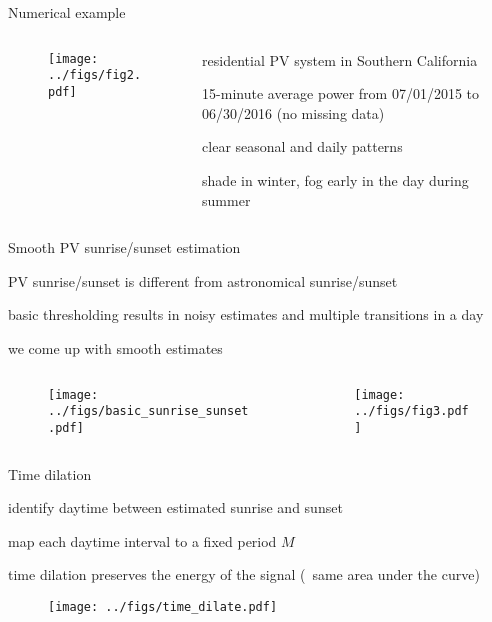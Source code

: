 \documentclass[aspectratio=169,11pt]{beamer}
\begin{document}
\begin{frame}{Numerical example}
\begin{columns}
	\begin{column}{0.5\textwidth}
		\begin{figure}
			\centering
			\texttt{[image: ../figs/fig2.pdf]}
		\end{figure}
	\end{column}
	\begin{column}{0.5\textwidth}
		\BIT
		\item residential PV system in Southern California
		\item 15-minute average power from 07/01/2015 to 06/30/2016
		(no missing data)
		\item clear seasonal and
		daily patterns
		\item shade in winter, fog early in the day during summer
		\EIT
	\end{column}
\end{columns}
\end{frame}

\begin{frame}{Smooth PV sunrise/sunset estimation}
\BIT
\item PV sunrise/sunset is different from astronomical sunrise/sunset
\item basic thresholding results in noisy estimates and multiple transitions in a day
\item we come up with smooth estimates
\EIT
	\begin{columns}
		\begin{column}{0.5\textwidth}
			\begin{figure}
				\centering
				\texttt{[image: ../figs/basic\_sunrise\_sunset.pdf]}
			\end{figure}
		\end{column}
		\begin{column}{0.5\textwidth}
			\begin{figure}
				\centering
				\texttt{[image: ../figs/fig3.pdf]}
			\end{figure}
		\end{column}
	\end{columns}

\end{frame}

\begin{frame}{Time dilation}
\BIT
\item identify daytime between estimated sunrise and sunset
\item map each daytime interval to a fixed period $M$
\item time dilation preserves the energy of the signal (\ie \ same area under the curve)
\EIT
\begin{figure}
\centerline{\texttt{[image: ../figs/time\_dilate.pdf]}}
\end{figure}
\end{frame}
\end{document}
